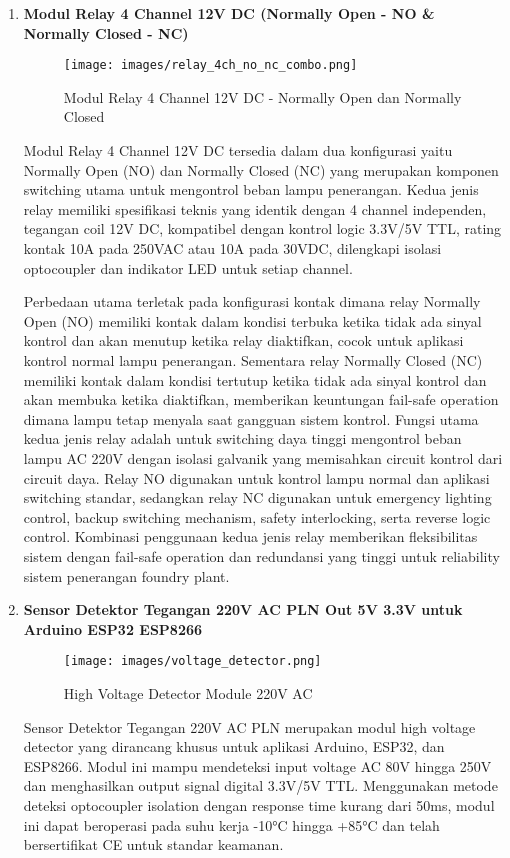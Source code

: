\documentclass[12pt,a4paper]{article}
\begin{document}
\begin{enumerate}[leftmargin=0pt,itemsep=1em]
\item \textbf{Modul Relay 4 Channel 12V DC (Normally Open - NO \& Normally Closed - NC)}

\begin{figure}[H]
\centering
\texttt{[image: images/relay\_4ch\_no\_nc\_combo.png]}
\caption{Modul Relay 4 Channel 12V DC - Normally Open dan Normally Closed}
\label{fig:relay4ch_combo}
\end{figure}

Modul Relay 4 Channel 12V DC tersedia dalam dua konfigurasi yaitu Normally Open (NO) dan Normally Closed (NC) yang merupakan komponen switching utama untuk mengontrol beban lampu penerangan. Kedua jenis relay memiliki spesifikasi teknis yang identik dengan 4 channel independen, tegangan coil 12V DC, kompatibel dengan kontrol logic 3.3V/5V TTL, rating kontak 10A pada 250VAC atau 10A pada 30VDC, dilengkapi isolasi optocoupler dan indikator LED untuk setiap channel.

Perbedaan utama terletak pada konfigurasi kontak dimana relay Normally Open (NO) memiliki kontak dalam kondisi terbuka ketika tidak ada sinyal kontrol dan akan menutup ketika relay diaktifkan, cocok untuk aplikasi kontrol normal lampu penerangan. Sementara relay Normally Closed (NC) memiliki kontak dalam kondisi tertutup ketika tidak ada sinyal kontrol dan akan membuka ketika diaktifkan, memberikan keuntungan fail-safe operation dimana lampu tetap menyala saat gangguan sistem kontrol. Fungsi utama kedua jenis relay adalah untuk switching daya tinggi mengontrol beban lampu AC 220V dengan isolasi galvanik yang memisahkan circuit kontrol dari circuit daya. Relay NO digunakan untuk kontrol lampu normal dan aplikasi switching standar, sedangkan relay NC digunakan untuk emergency lighting control, backup switching mechanism, safety interlocking, serta reverse logic control. Kombinasi penggunaan kedua jenis relay memberikan fleksibilitas sistem dengan fail-safe operation dan redundansi yang tinggi untuk reliability sistem penerangan foundry plant.

\item \textbf{Sensor Detektor Tegangan 220V AC PLN Out 5V 3.3V untuk Arduino ESP32 ESP8266}

\begin{figure}[H]
\centering
\texttt{[image: images/voltage\_detector.png]}
\caption{High Voltage Detector Module 220V AC}
\label{fig:voltage_detector}
\end{figure}

Sensor Detektor Tegangan 220V AC PLN merupakan modul high voltage detector yang dirancang khusus untuk aplikasi Arduino, ESP32, dan ESP8266. Modul ini mampu mendeteksi input voltage AC 80V hingga 250V dan menghasilkan output signal digital 3.3V/5V TTL. Menggunakan metode deteksi optocoupler isolation dengan response time kurang dari 50ms, modul ini dapat beroperasi pada suhu kerja -10°C hingga +85°C dan telah bersertifikat CE untuk standar keamanan.


\end{enumerate}
\end{document}
